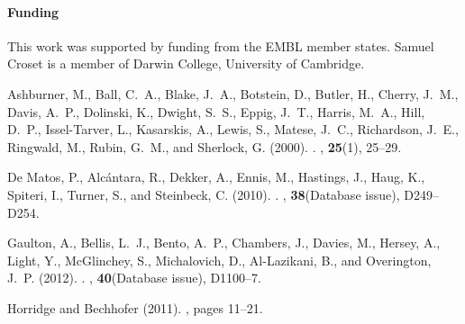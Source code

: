 \documentclass{bioinfo}
\begin{document}
\paragraph{Funding\textcolon}
This work was supported by funding from the EMBL member states. Samuel Croset is a member of Darwin College, University of Cambridge.

% 
% 
% 
% 
% 
% 
% 
% 
%  


\begin{thebibliography}{}

Ashburner, M., Ball, C.~A., Blake, J.~A., Botstein, D., Butler, H., Cherry,
  J.~M., Davis, A.~P., Dolinski, K., Dwight, S.~S., Eppig, J.~T., Harris,
  M.~A., Hill, D.~P., Issel-Tarver, L., Kasarskis, A., Lewis, S., Matese,
  J.~C., Richardson, J.~E., Ringwald, M., Rubin, G.~M., and Sherlock, G.
  (2000).
.
, {\bf 25}(1), 25--29.

{De Matos}, P., Alc\'{a}ntara, R., Dekker, A., Ennis, M., Hastings, J., Haug,
  K., Spiteri, I., Turner, S., and Steinbeck, C. (2010).
.
, {\bf 38}(Database issue), D249--D254.

Gaulton, A., Bellis, L.~J., Bento, A.~P., Chambers, J., Davies, M., Hersey, A.,
  Light, Y., McGlinchey, S., Michalovich, D., Al-Lazikani, B., and Overington,
  J.~P. (2012).
.
, {\bf 40}(Database issue), D1100--7.

{Horridge} and {Bechhofer} (2011).
, pages 11--21.


\end{thebibliography}
\end{document}
